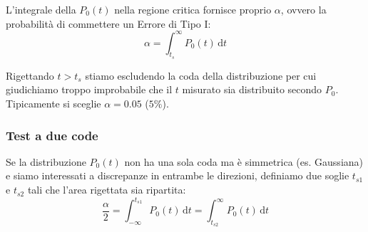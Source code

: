 \documentclass[openany,a4paper,12pt]{book}
\theoremstyle{remark}
\begin{document}
L'integrale della $P_0(t)$ nella regione critica fornisce proprio $\alpha$, ovvero la probabilità di commettere un Errore di Tipo I:
\begin{equation}
    \alpha = \int_{t_s}^{\infty} P_0(t) \, \mathrm{d}t
\end{equation}

\begin{center}
\end{center}
Rigettando $t > t_s$ stiamo escludendo la coda della distribuzione per cui giudichiamo troppo improbabile che il $t$ misurato sia distribuito secondo $P_0$. Tipicamente si sceglie $\alpha = 0.05$ ($5\%$).

\subsubsection*{Test a due code}
Se la distribuzione $P_0(t)$ non ha una sola coda ma è simmetrica (es. Gaussiana) e siamo interessati a discrepanze in entrambe le direzioni, definiamo due soglie $t_{s1}$ e $t_{s2}$ tali che l'area rigettata sia ripartita:
\begin{equation*}
\frac{\alpha}{2} = \int_{-\infty}^{t_{s1}} P_0(t) \, \mathrm{d}t = \int_{t_{s2}}^{\infty} P_0(t) \, \mathrm{d}t
\end{equation*}
\end{document}
